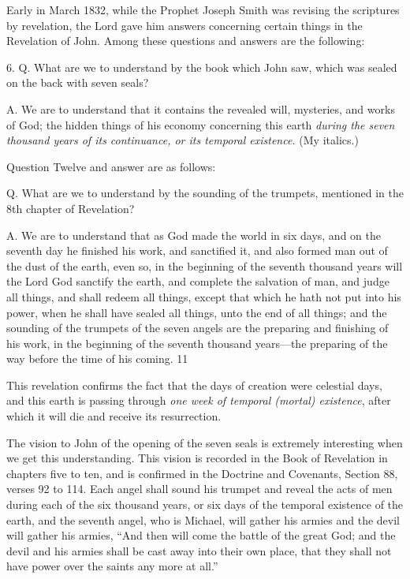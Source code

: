 Early in March 1832, while the Prophet Joseph Smith was revising the scriptures by
revelation, the Lord gave him answers concerning certain things in the Revelation of John.
Among these questions and answers are the following:

6. Q. What are we to understand by the book which John saw, which was sealed on the back
with seven seals?

A. We are to understand that it contains the revealed will, mysteries, and works of God; the
hidden things of his economy concerning this earth \textit{during the seven thousand years of its
continuance, or its temporal existence.} (My italics.)

Question Twelve and answer are as follows:

Q. What are we to understand by the sounding of the trumpets, mentioned in the 8th chapter
of Revelation?

A. We are to understand that as God made the world in six days, and on the seventh day he
finished his work, and sanctified it, and also formed man out of the dust of the earth, even so,
in the beginning of the seventh thousand years will the Lord God sanctify the earth, and
complete the salvation of man, and judge all things, and shall redeem all things, except that
which he hath not put into his power, when he shall have sealed all things, unto the end of all
things; and the sounding of the trumpets of the seven angels are the preparing and finishing
of his work, in the beginning of the seventh thousand years—the preparing of the way before
the time of his coming. 11

This revelation confirms the fact that the days of creation were celestial days, and this earth
is passing through \textit{one week of temporal (mortal) existence}, after which it will die and
receive its resurrection.

The vision to John of the opening of the seven seals is extremely interesting when we get this
understanding. This vision is recorded in the Book of Revelation in chapters five to ten, and
is confirmed in the Doctrine and Covenants, Section 88, verses 92 to 114. Each angel shall
sound his trumpet and reveal the acts of men during each of the six thousand years, or six
days of the temporal existence of the earth, and the seventh angel, who is Michael, will
gather his armies and the devil will gather his armies, ``And then will come the battle of the
great God; and the devil and his armies shall be cast away into their own place, that they
shall not have power over the saints any more at all.''

